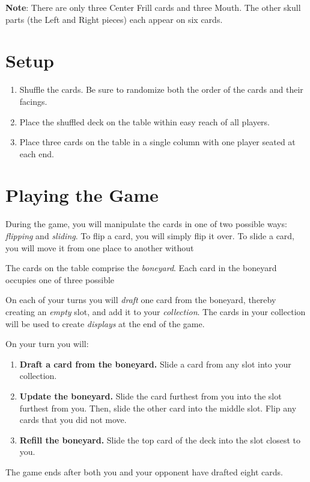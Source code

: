 \documentclass[a6paper, parskip=half, DIV=14, 10pt]{scrartcl}
\begin{document}
\textbf{Note}: There are only three Center Frill cards and three Mouth. The other skull parts (the Left and Right pieces) each appear on six cards.

\section*{Setup}
\begin{enumerate}[leftmargin=*]
	\item Shuffle the cards. Be sure to randomize both the order of the cards and their facings.
	\item Place the shuffled deck on the table within easy reach of all players.
	\item Place three cards on the table in a single column with one player seated at each end.
\end{enumerate}

\newpage

\section*{Playing the Game}
During the game, you will manipulate the cards in one of two possible ways: \emph{flipping} and \emph{sliding}. To flip a card, you will simply flip it over. To slide a card, you will move it from one place to another without%

The cards on the table comprise the \emph{boneyard}. Each card in the boneyard occupies one of three possible%

On each of your turns you will \emph{draft} one card from the boneyard, thereby creating an \emph{empty} slot, and add it to your \emph{collection}. The cards in your collection will be used to create \emph{displays} at the end of the game.

On your turn you will:
\begin{enumerate}[leftmargin=*]
	\item \textbf{Draft a card from the boneyard.} Slide a card from any slot into your collection.
	\item \textbf{Update the boneyard.} Slide the card furthest from you into the slot furthest from you. Then, slide the other card into the middle slot. Flip any cards that you did not move.
	\item \textbf{Refill the boneyard.} Slide the top card of the deck into the slot closest to you.
\end{enumerate}
The game ends after both you and your opponent have drafted eight cards.
\end{document}
